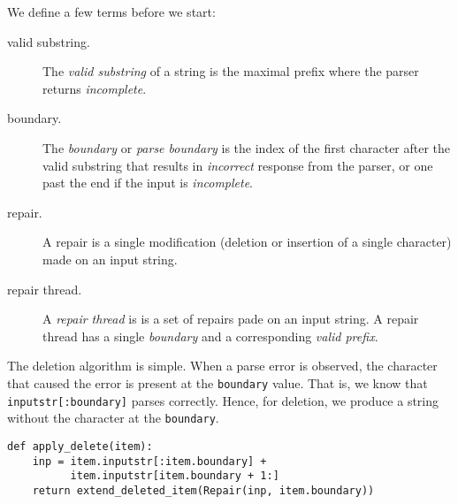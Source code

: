 \documentclass[sigconf,review,anonymous]{acmart}
\def\<#1>{\texttt{#1}}
\newcommand{\brepair}{\textsc{FSynth}\xspace}
\begin{document}
We define a few terms before we start:
\begin{description}
\item[valid substring.] The \emph{valid substring} of a string is the maximal prefix where the parser returns
\emph{incomplete}.
\item[boundary.] The \emph{boundary} or \emph{parse boundary} is the index of
the first character after the valid substring that results in
\emph{incorrect} response from the parser, or one past the end if the input is
\emph{incomplete}.
\item[repair.] A repair is a single modification (deletion or insertion of a
single character) made on an input string.
\item[repair thread.] A \emph{repair thread} is is a set of repairs pade on an
input string. A repair thread has a single \emph{boundary} and a corresponding
\emph{valid prefix}.
\end{description}

The deletion algorithm is simple. When a parse error is observed,
the character that caused the error is present at the \<boundary> value.
That is, we know that \<inputstr[:boundary]> parses correctly. Hence, for
deletion, we produce a string without the character at the \<boundary>.
\begin{lstlisting}[caption=\brepair repairs,label={lst:repairsdelete}]
def apply_delete(item):
    inp = item.inputstr[:item.boundary] +
          item.inputstr[item.boundary + 1:]
    return extend_deleted_item(Repair(inp, item.boundary))
\end{lstlisting}
\end{document}
